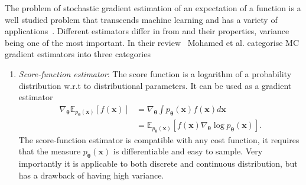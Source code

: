 \documentclass[final,3p,times,twocolumn]{elsarticle}
\begin{document}
The problem of stochastic gradient estimation of an expectation of a function is a well studied problem that transcends machine learning and has a variety of applications~\cite{chriss1997black, schrittwieser2020mastering}. Different estimators differ in from and their properties, variance being one of the most important. In their review~\cite{mohamed2020monte} Mohamed et al. categorise MC gradient estimators into three categories
\begin{enumerate}
	\item \emph{Score-function estimator}: The score function is a logarithm of a probability distribution w.r.t to distributional parameters. It can be used as a gradient estimator
	\begin{equation}
		\begin{aligned}
		\nabla_{\boldsymbol{\theta}} \mathbb{E}_{p_{\boldsymbol{\theta}}(\mathbf{x})}[f(\mathbf{x})] &=  \nabla_{\boldsymbol{\theta}} \int p_{\boldsymbol{\theta}}(\mathbf{x}) f(\mathbf{x}) d \mathbf{x} \\
		&= \mathbb{E}_{p_{\boldsymbol{\theta}}(\mathbf{x})}\left[f(\mathbf{x}) \nabla_{\boldsymbol{\theta}} \log p_{\boldsymbol{\theta}}(\mathbf{x})\right].
		\end{aligned}
	\end{equation}
	The score-function estimator is compatible with any cost function, it requires that the measure $p_{\boldsymbol{\theta}}(\mathbf{x})$ is differentiable and easy to sample. Very importantly it is applicable to both discrete and continuous distribution, but has a drawback of having high variance.


\end{enumerate}
\end{document}
